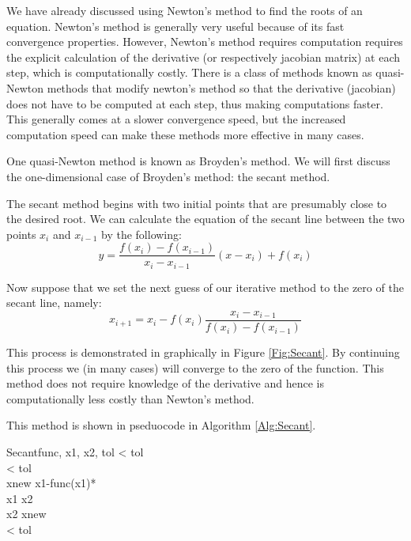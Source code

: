 

We have already discussed using Newton's method to find the roots of an equation. Newton's method is generally very useful because of its fast convergence properties. However, Newton's method requires computation requires the explicit calculation of the derivative (or respectively jacobian matrix) at each step, which is computationally costly. There is a class of methods known as quasi-Newton methods that modify newton's method so that the derivative (jacobian) does not have to be computed at each step, thus making computations faster. This generally comes at a slower convergence speed, but the increased computation speed can make these methods more effective in many cases.

One quasi-Newton method is known as Broyden's method. We will first discuss the one-dimensional case of Broyden's method: the secant method.

The secant method begins with two initial points that are presumably close to the desired root. We can calculate the equation of the secant line between the two points $x_i$ and $x_{i-1}$ by the following:
\[
y = \frac{f(x_i)-f(x_{i-1})}{x_i-x_{i-1}}(x-x_i) + f(x_i)
\]

Now suppose that we set the next guess of our iterative method to the zero of the secant line, namely:
\[
x_{i+1} = x_i - f(x_i)\frac{x_i-x_{i-1}}{f(x_i)-f(x_{i-1})}
\]

This process is demonstrated in graphically in Figure \ref{Fig:Secant}.  By continuing this process we (in many cases) will converge to the zero of the function. This method does not require knowledge of the derivative and hence is computationally less costly than Newton's method.

This method is shown in pseduocode in Algorithm \ref{Alg:Secant}.

\begin{pseudo}{Secant}{func, x1, x2, tol}
\label{Alg:Secant}
\IF {} < tol \THEN
    \\
\IF {} < tol \THEN
    \\

\REPEAT 
xnew \GETS x1-func(x1)*\\
x1 \GETS x2 \\
x2 \GETS xnew \\
\UNTIL {} < tol \THEN {}
\end{pseudo}


